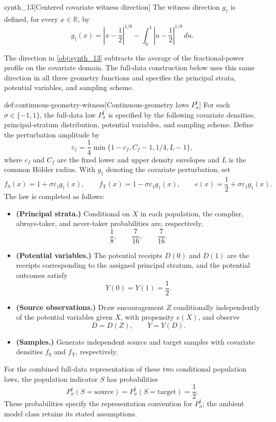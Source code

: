 \begin{definitionv}{synth_13}[Centered covariate witness direction]
The witness direction \(g_{\dagger}\) is defined, for every \(x\in\mathbb R\), by
\[
g_{\dagger}(x)
=
\left|x-\frac12\right|^{1/8}
-
\int_0^1 \left|u-\frac12\right|^{1/8}\,du.
\]
\end{definitionv}

The direction  in \cref{obj:synth_13} subtracts the average of the fractional-power profile on the covariate domain. The full-data construction below uses this same direction in all three geometry functions and specifies the principal strata, potential variables, and sampling scheme.

\begin{definitionv}{def:continuous-geometry-witness}[Continuous-geometry laws $P_{\sigma}^{\dagger}$]
For each \(\sigma\in\{-1,1\}\), the full-data law \(P_{\sigma}^{\dagger}\) is specified by the following covariate densities, principal-stratum distribution, potential variables, and sampling scheme. Define the perturbation amplitude by
\[
\varepsilon_{\dagger}
=
\frac14\min\{1-c_f,C_f-1,1/4,L-1\},
\]
where \(c_f\) and \(C_f\) are the fixed lower and upper density envelopes and \(L\) is the common Hölder radius. With \(g_{\dagger}\) denoting the covariate perturbation, set
\[
f_{\mathrm S}(x)=1+\sigma\varepsilon_{\dagger}g_{\dagger}(x),
\qquad
f_{\mathrm T}(x)=1-\sigma\varepsilon_{\dagger}g_{\dagger}(x),
\qquad
e(x)=\frac12+\sigma\varepsilon_{\dagger}g_{\dagger}(x).
\]
The law is completed as follows:
\begin{itemize}
\item \textbf{(Principal strata.)} Conditional on \(X\) in each population, the complier, always-taker, and never-taker probabilities are, respectively,
\[
\frac18,\qquad \frac7{16},\qquad \frac7{16}.
\]
\item \textbf{(Potential variables.)} The potential receipts \(D(0)\) and \(D(1)\) are the receipts corresponding to the assigned principal stratum, and the potential outcomes satisfy
\[
Y(0)=Y(1)=\frac12.
\]
\item \textbf{(Source observations.)} Draw encouragement \(Z\) conditionally independently of the potential variables given \(X\), with propensity \(e(X)\), and observe
\[
D=D(Z),\qquad Y=Y(D).
\]
\item \textbf{(Samples.)} Generate independent source and target samples with covariate densities \(f_{\mathrm S}\) and \(f_{\mathrm T}\), respectively.
\end{itemize}
For the combined full-data representation of these two conditional population laws, the population indicator \(S\) has probabilities
\[
P_{\sigma}^{\dagger}(S=\mathrm{source})
=
P_{\sigma}^{\dagger}(S=\mathrm{target})
=
\frac12.
\]
These probabilities specify the representation convention for \(P_{\sigma}^{\dagger}\); the ambient model class retains its stated assumptions.
\end{definitionv}

